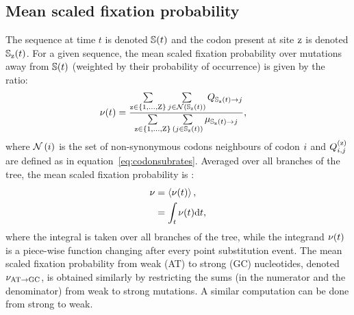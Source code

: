 \subsection{Mean scaled fixation probability}
\label{subsec:fixation-bias}
The sequence at time $t$ is denoted $\mathbb{S}(t)$ and the codon present at site $\text{z}$ is denoted $\mathbb{S}_{\text{z}}(t)$.
For a given sequence, the mean scaled fixation probability over mutations away from $\mathbb{S}(t)$ (weighted by their probability of occurrence) is given by the ratio:
\begin{align}
    \nu (t) & = \dfrac{ \sum\limits_{\text{z} \in \{1, \hdots, \text{Z}\}} \sum\limits_{{j} \in \mathcal{N} \left ( \mathbb{S}_{\text{z}}(t) \right)} Q_{\mathbb{S}_{\text{z}}(t) \to {j}}}{ \sum\limits_{\text{z} \in \{1, \hdots, \text{Z}\}} \sum\limits_{\left ( {j} \in \mathbb{S}_{\text{z}}(t) \right)} \mu_{\mathbb{S}_{\text{z}}(t) \to {j}}},
\end{align}
where $\mathcal{N}\left({i}\right)$ is the set of non-synonymous codons neighbours of codon ${i}$ and $Q_{{i}, {j}}^{(\text{z})}$ are defined as in equation~\ref{eq:codonsubrates}.
Averaged over all branches of the tree, the mean scaled fixation probability is :
\begin{align}
    \nu & = \left\langle \nu (t) \right\rangle, \\
    & = \int_{t} \nu (t) \text{d} t,
\end{align}
where the integral is taken over all branches of the tree, while the integrand $\nu (t)$ is a piece-wise function changing after every point substitution event.
The mean scaled fixation probability from weak (AT) to strong (GC) nucleotides, denoted $\nu_{\text{AT} \rightarrow \text{GC}}$, is obtained similarly by restricting the sums (in the numerator and the denominator) from weak to strong mutations.
A similar computation can be done from strong to weak.

